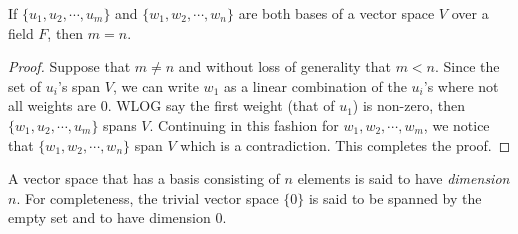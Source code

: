 \begin{proposition}
	If $\{u_1,u_2,\cdots,u_m\}$ and $\{w_1,w_2,\cdots,w_n\}$ are both bases of a vector space $V$ over a field $F$, then $m=n$.
\end{proposition}
\begin{proof}
	Suppose that $m\ne n$ and without loss of generality that $m<n$. Since the set of $u_i$'s span $V$, we can write $w_1$ as a linear combination of the $u_i$'s where not all weights are $0$. WLOG say the first weight (that of $u_1$) is non-zero, then $\{w_1,u_2,\cdots,u_m\}$ spans $V$. Continuing in this fashion for $w_1,w_2,\cdots,w_m$, we notice that $\{w_1,w_2,\cdots,w_n\}$ span $V$ which is a contradiction. This completes the proof.
\end{proof}

\begin{definition}[Dimension]
	A vector space that has a basis consisting of $n$ elements is said to have \textit{dimension} $n$. For completeness, the trivial vector space $\{0\}$ is said to be spanned by the empty set and to have dimension $0$.
\end{definition}